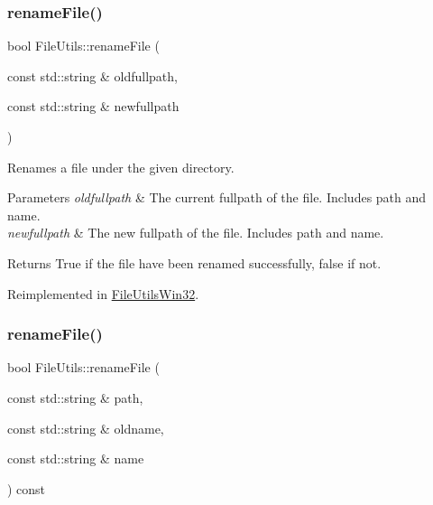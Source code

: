\subsubsection{\texorpdfstring{rename\+File()}{renameFile()}\hspace{0.1cm}{\footnotesize\ttfamily [2/6]}}
{\footnotesize\ttfamily bool File\+Utils\+::rename\+File (\begin{DoxyParamCaption}\item[{const std\+::string \&}]{oldfullpath,  }\item[{const std\+::string \&}]{newfullpath }\end{DoxyParamCaption})\hspace{0.3cm}{\ttfamily [virtual]}}

Renames a file under the given directory.


\begin{DoxyParams}{Parameters}
{\em oldfullpath} & The current fullpath of the file. Includes path and name. \\
\hline
{\em newfullpath} & The new fullpath of the file. Includes path and name. \\
\hline
\end{DoxyParams}
\begin{DoxyReturn}{Returns}
True if the file have been renamed successfully, false if not. 
\end{DoxyReturn}


Reimplemented in \hyperlink{classFileUtilsWin32_ac583dacdd0e02e0a92d32a31ba8f8d51}{File\+Utils\+Win32}.

\mbox{\label{classFileUtils_a9228ab64b14c71afca8c5e4f7fb9bb55}} 
\subsubsection{\texorpdfstring{rename\+File()}{renameFile()}\hspace{0.1cm}{\footnotesize\ttfamily [3/6]}}
{\footnotesize\ttfamily bool File\+Utils\+::rename\+File (\begin{DoxyParamCaption}\item[{const std\+::string \&}]{path,  }\item[{const std\+::string \&}]{oldname,  }\item[{const std\+::string \&}]{name }\end{DoxyParamCaption}) const\hspace{0.3cm}{\ttfamily [virtual]}}

